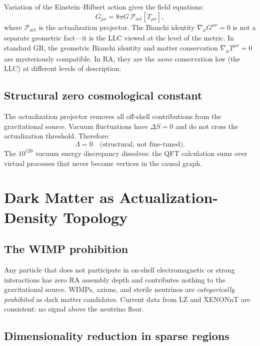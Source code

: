 \documentclass[11pt,a4paper]{article}
\theoremstyle{plain}
\theoremstyle{definition}
\theoremstyle{remark}
\newcommand{\Pact}{\mathcal{P}_{\mathrm{act}}}
\begin{document}
Variation of the Einstein--Hilbert action gives the field equations:
\begin{equation}
G_{\mu\nu} = 8\pi G\,\Pact[T_{\mu\nu}],
\label{eq:efe}
\end{equation}
where $\Pact$ is the actualization projector.  The Bianchi identity
$\nabla_\mu G^{\mu\nu} = 0$ is not a separate geometric fact---it is the LLC
viewed at the level of the metric.  In standard GR, the geometric Bianchi identity
and matter conservation $\nabla_\mu T^{\mu\nu} = 0$ are mysteriously compatible.
In RA, they are the \emph{same} conservation law (the LLC) at different levels of
description.

\subsection{Structural zero cosmological constant}\label{sec:lambda}

The actualization projector removes all off-shell contributions from the
gravitational source.  Vacuum fluctuations have $\Delta S = 0$ and do not cross the
actualization threshold.  Therefore:
\begin{equation}
\Lambda = 0 \quad\text{(structural, not fine-tuned).}
\label{eq:lambda}
\end{equation}
The $10^{120}$ vacuum energy discrepancy dissolves: the QFT calculation sums over
virtual processes that never become vertices in the causal graph.

\section{Dark Matter as Actualization-Density Topology}\label{sec:dm}

\subsection{The WIMP prohibition}\label{sec:wimp}

Any particle that does not participate in on-shell electromagnetic or strong
interactions has zero RA assembly depth and contributes nothing to the gravitational
source.  WIMPs, axions, and sterile neutrinos are \emph{categorically prohibited}
as dark matter candidates.  Current data from LZ and XENONnT are consistent: no
signal above the neutrino floor.

\subsection{Dimensionality reduction in sparse regions}\label{sec:dim-red}
\end{document}
